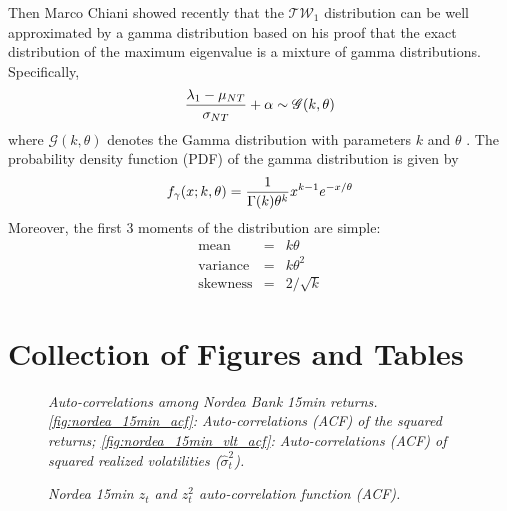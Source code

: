 \documentclass{report}
\begin{document}
Then Marco Chiani showed recently that the $\mathscr{TW}_1$ distribution
can be well approximated by a gamma distribution based on his proof
that the exact distribution of the maximum eigenvalue is a mixture of
gamma distributions. Specifically,
\begin{equation}\label{eq:TracyWidom-Gamma}
  {\lambda_1 - \mu_{NT} \over \sigma_{NT}} + \alpha \sim
  \mathscr{G}(k ,\theta)
\end{equation}
where $\mathscr{G}(k, \theta)$ denotes the Gamma distribution with
parameters $k$ and $\theta$ \cite{Chiani2012}. The probability
density function (PDF) of the gamma distribution is given by
\begin{equation*}
  f_\gamma(x; k, \theta) = {1 \over \Gamma(k) \theta^k} x^{k-1}
  e^{-x/\theta}
\end{equation*}
Moreover, the first 3 moments of the distribution are simple:
\begin{eqnarray*}
  \text{mean} &=& k\theta \\
  \text{variance} &=& k\theta^2 \\
  \text{skewness} &=& 2/\sqrt{k}
\end{eqnarray*}

\section{Collection of Figures and Tables}

\begin{figure}[htb!]
  \centering
  \caption{\small \it Auto-correlations among Nordea Bank 15min
    returns. \ref{fig:nordea_15min_acf}: Auto-correlations (ACF) of the
    squared returns; \ref{fig:nordea_15min_vlt_acf}: Auto-correlations
    (ACF) of squared realized volatilities ($\hat{\sigma}^2_t$).}
\end{figure}

\begin{figure}[htb!]
  \centering
  \caption{\small \it Nordea 15min $z_t$ and $z_t^2$ auto-correlation
    function (ACF).}
\end{figure}
\end{document}
